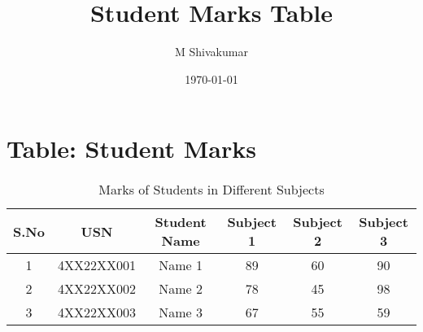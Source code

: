 \documentclass[a4paper,12pt]{article}
\begin{document}
\title{Student Marks Table}
\author{M Shivakumar} %
\date{\today}
\maketitle
\section*{Table: Student Marks}
\begin{table}[h!]
\centering
\begin{tabular}{|c|c|c|c|c|c|}
\hline
\textbf{S.No} & \textbf{USN} & \textbf{Student Name} & \textbf{Subject 1} & \textbf{Subject 2} & \textbf{Subject 3} \\ \hline
1 & 4XX22XX001 & Name 1 & 89 & 60 & 90 \\ \hline
2 & 4XX22XX002 & Name 2 & 78 & 45 & 98 \\ \hline
3 & 4XX22XX003 & Name 3 & 67 & 55 & 59 \\ \hline
\end{tabular}
\caption{Marks of Students in Different Subjects}
\end{table}
\end{document}
